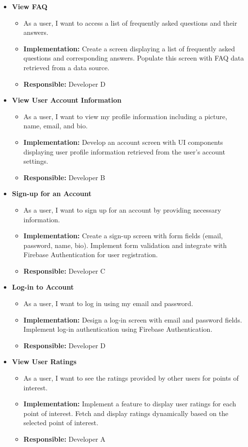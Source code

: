 \begin{itemize}
	\item \textbf{View FAQ}
	\begin{itemize}
		\item As a user, I want to access a list of frequently asked questions and their answers.
		\item \textbf{Implementation:} Create a screen displaying a list of frequently asked questions and corresponding answers. Populate this screen with FAQ data retrieved from a data source.
		\item \textbf{Responsible:} Developer D
	\end{itemize}
	
	\item \textbf{View User Account Information}
	\begin{itemize}
		\item As a user, I want to view my profile information including a picture, name, email, and bio.
		\item \textbf{Implementation:} Develop an account screen with UI components displaying user profile information retrieved from the user's account settings.
		\item \textbf{Responsible:} Developer B
	\end{itemize}
	
	\item \textbf{Sign-up for an Account}
	\begin{itemize}
		\item As a user, I want to sign up for an account by providing necessary information.
		\item \textbf{Implementation:} Create a sign-up screen with form fields (email, password, name, bio). Implement form validation and integrate with Firebase Authentication for user registration.
		\item \textbf{Responsible:} Developer C
	\end{itemize}
	
	\item \textbf{Log-in to Account}
	\begin{itemize}
		\item As a user, I want to log in using my email and password.
		\item \textbf{Implementation:} Design a log-in screen with email and password fields. Implement log-in authentication using Firebase Authentication.
		\item \textbf{Responsible:} Developer D
	\end{itemize}
	
	\item \textbf{View User Ratings}
	\begin{itemize}
		\item As a user, I want to see the ratings provided by other users for points of interest.
		\item \textbf{Implementation:} Implement a feature to display user ratings for each point of interest. Fetch and display ratings dynamically based on the selected point of interest.
		\item \textbf{Responsible:} Developer A
	\end{itemize}
\end{itemize}

